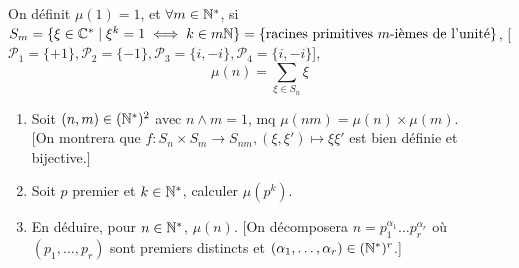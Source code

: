 
\begin{statementbox}
On définit $\mu(1) = 1$, et $\forall m \in \mathbb N^*$, si $S_m = \{\xi \in \mathbb{C}^* \mid \xi^k = 1 \iff k \in m\mathbb N\} = \{\text{racines primitives } m\text{-ièmes de l'unité}\}$, [$\mathcal{P}_1 = \{+1\}, \mathcal{P}_2 = \{-1\}, \mathcal{P}_3 = \{i, -i\}, \mathcal{P}_4 = \{i, -i\}$],
\[ \mu(n) = \sum_{\xi \in S_n} \xi \]
\begin{enumerate}[label=\alph*)]
  \item Soit $(n,m) \in (\mathbb N^*)^2$ avec $n \wedge m = 1$, mq $\mu(n m) = \mu(n) \times \mu(m)$. \\
  $\big[$On montrera que $f : S_n \times S_m \to S_{nm}, (\xi, \xi') \mapsto \xi \xi'$ est bien définie et bijective.$\big]$
  \item Soit $p$ premier et $k \in \mathbb N^*$, calculer $\mu(p^k)$.
  \item En déduire, pour $n \in \mathbb N^*$, $\mu(n)$. $\big[$On décomposera $n = p_1^{\alpha_1} \dots p_r^{\alpha_r}$ où $(p_1, \dots, p_r)$ sont premiers distincts et $(\alpha_1, \dots, \alpha_r) \in (\mathbb N^*)^r$.\big]
\end{enumerate}
\end{statementbox}

